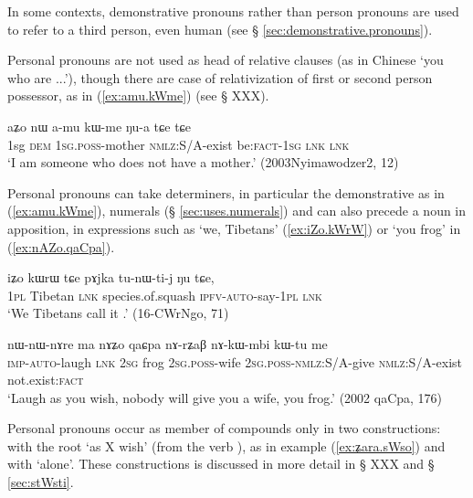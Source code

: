 In some contexts, demonstrative pronouns rather than person pronouns are used to refer to a third person, even human (see § \ref{sec:demonstrative.pronouns}).

Personal pronouns are not used as head of relative clauses (as in Chinese  `you who are ...'), though there are case of relativization of first or second person possessor, as in (\ref{ex:amu.kWme}) (see § XXX).

\begin{exe}
\ex \label{ex:amu.kWme}
\gll aʑo nɯ a-mu kɯ-me ŋu-a tɕe tɕe \\
1sg \textsc{dem} \textsc{1sg.poss}-mother \textsc{nmlz}:S/A-exist be:\textsc{fact-1sg} \textsc{lnk} \textsc{lnk} \\
\glt `I am someone who does not have a mother.' (2003Nyimawodzer2, 12)
\end{exe}

Personal pronouns can take determiners, in particular the demonstrative  as in (\ref{ex:amu.kWme}), numerals (§ \ref{sec:uses.numerals}) and can also precede a noun in apposition, in expressions such as  `we, Tibetans' (\ref{ex:iZo.kWrW}) or  `you frog' in (\ref{ex:nAZo.qaCpa}).

\begin{exe}
\ex \label{ex:iZo.kWrW}
\gll
iʑo kɯrɯ tɕe pɤjka tu-nɯ-ti-j ŋu tɕe, \\
\textsc{1pl} Tibetan \textsc{lnk} species.of.squash \textsc{ipfv}-\textsc{auto}-say-\textsc{1pl} \textsc{lnk} \\
\glt `We Tibetans call it .' (16-CWrNgo, 71)
\end{exe}

\begin{exe}
\ex  \label{ex:nAZo.qaCpa}
\gll  nɯ-nɯ-nɤre ma nɤʑo qaɕpa nɤ-rʑaβ nɤ-kɯ-mbi kɯ-tu me   \\
\textsc{imp-auto}-laugh \textsc{lnk} \textsc{2sg} frog \textsc{2sg.poss}-wife \textsc{2sg.poss}-\textsc{nmlz}:S/A-give \textsc{nmlz}:S/A-exist not.exist:\textsc{fact} \\
\glt `Laugh as you wish, nobody will give you a wife, you frog.'   (2002 qaCpa, 176)
\end{exe} 

Personal pronouns occur as member of compounds only in two constructions: with the root  `as X wish' (from the verb ), as in example (\ref{ex:ʑara.sWso}) and with  `alone'. These constructions is discussed in more detail in § XXX and § \ref{sec:stWsti}.

